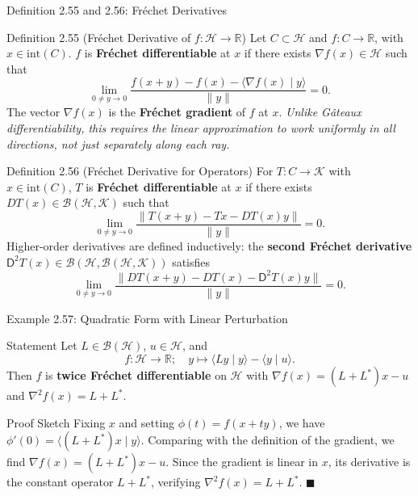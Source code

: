 \documentclass[aspectratio=169,10pt]{beamer}
\newcommand{\R}{\mathbb{R}}
\newcommand{\Hil}{\mathcal{H}}
\newcommand{\Kil}{\mathcal{K}}
\newcommand{\ip}[2]{\langle #1 \mid #2 \rangle}
\begin{document}
\begin{frame}[allowframebreaks]{Definition 2.55 and 2.56: Fr\'echet Derivatives}

  \begin{block}{Definition 2.55 (Fr\'echet Derivative of $f: \Hil \to \R$)}
    Let $C\subset\Hil$ and $f:C\to\R$, with $x \in \text{int}(C)$. $f$ is
    \textbf{Fr\'echet differentiable} at $x$ if there exists
    $\nabla f(x) \in \Hil$ such that
    \[
      \lim_{0 \ne y \to 0} \frac{f(x+y) - f(x) - \ip{\nabla f(x)}{y}}{\|y\|}
      = 0.
    \]
    The vector $\nabla f(x)$ is the \textbf{Fr\'echet gradient} of $f$ at $x$.
    \textit{Unlike G\^ateaux differentiability, this requires the linear
    approximation to work uniformly in all directions, not just separately
    along each ray.}
  \end{block}

  \framebreak

  \begin{block}{Definition 2.56 (Fr\'echet Derivative for Operators)}
    For $T:C\to\Kil$ with $x \in \text{int}(C)$, $T$ is \textbf{Fr\'echet
    differentiable} at $x$ if there exists $DT(x)\in\mathcal B(\Hil,\Kil)$
    such that
    \[
      \lim_{0 \ne y \to 0} \frac{\|T(x+y) - Tx - DT(x)y\|}{\|y\|} = 0.
    \]
    Higher-order derivatives are defined inductively: the \textbf{second
    Fr\'echet derivative} $\mathsf D^2 T(x) \in \mathcal B(\Hil,
    \mathcal B(\Hil,\Kil))$ satisfies
    \[
      \lim_{0 \ne y \to 0} \frac{\|DT(x+y) - DT(x) - \mathsf D^2 T(x)y\|}{\|y\|}
      = 0.
    \]
  \end{block}

\end{frame}

\begin{frame}{Example 2.57: Quadratic Form with Linear Perturbation}

  \begin{block}{Statement}
    Let $L \in \mathcal B(\Hil)$, $u \in \Hil$, and
    \[
      f: \Hil \to \R; \quad y \mapsto \ip{Ly}{y} - \ip{y}{u}.
    \]
    Then $f$ is \textbf{twice Fr\'echet differentiable} on $\Hil$ with
    $\nabla f(x) = (L+L^*)x - u$ and $\nabla^2 f(x) = L+L^*$.
  \end{block}

  \begin{block}{Proof Sketch}
    Fixing $x$ and setting $\phi(t) = f(x + ty)$, we have $\phi'(0) =
    \ip{(L+L^*)x}{y}$. Comparing with the definition of the gradient, we find
    $\nabla f(x) = (L+L^*)x - u$. Since the gradient is linear in $x$, its
    derivative is the constant operator $L+L^*$, verifying $\nabla^2 f(x)
    = L+L^*$. $\blacksquare$
  \end{block}

\end{frame}
\end{document}
